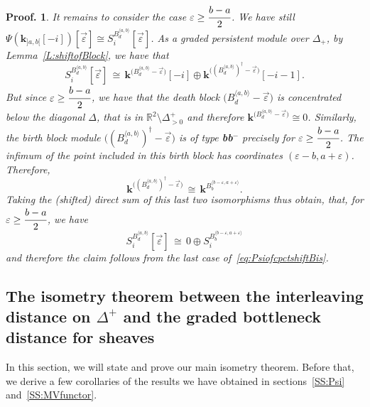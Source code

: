\documentclass[a4paper, english, 11pt]{article}
\newcommand{\kk}[0]{\textbf{k}}
\newcommand{\0}{\vec{0}}
\newtheorem*{pf}{Proof.} }
\begin{document}
\begin{pf}
\smallskip

It remains to consider the case  $\varepsilon \geq \cfrac{b-a}{2}$. We have still $\Psi(\kk_{]a,b[}[-i]) [\vec{\varepsilon}] \cong S_i^{B_{d}^{\langle a, b \rangle}} [\vec{\varepsilon}]$. As a graded persistent module over $\Delta_+$, by Lemma~\ref{L:shiftofBlock}, we have  
 that
$$S_i^{B_{d}^{\langle a, b \rangle}} [\vec{\varepsilon}] \,\cong\, \kk^{\big(B_{d}^{\langle a, b \rangle} -\vec{\varepsilon}\big)} [-i] \oplus \kk^{\big((B_{d}^{\langle a, b\rangle})^\dagger -\vec{\varepsilon}\big)} [-i-1].$$ 
But since  $\varepsilon \geq \cfrac{b-a}{2}$, we have that the death block  $\big(B_{d}^{\langle a, b \rangle} -\vec{\varepsilon}\big)$ is concentrated below the diagonal $\Delta$, that is in $\mathbb{R}^2\setminus \Delta^+_{>0}$ and therefore $ \kk^{\big(B_{d}^{\langle a, b \rangle} -\vec{\varepsilon}\big)}\cong 0$.  Similarly, the birth block module  
$\big((B_{d}^{\langle a, b\rangle})^\dagger -\vec{\varepsilon}\big)$ is of type \textbf{bb}$^{-}$ precisely for $\varepsilon \geq \cfrac{b-a}{2}$. The infimum of the point included in this birth block has coordinates $(\varepsilon -b, a+\varepsilon)$. Therefore, 
$$\kk^{\big((B_{d}^{\langle a, b\rangle})^\dagger -\vec{\varepsilon}\big)} \, \cong \, \kk^{B_{b}^{\langle b-\varepsilon, a+\varepsilon \rangle}}.$$
Taking the (shifted) direct sum of this last two isomorphisms thus obtain, that, for $\varepsilon \geq \cfrac{b-a}{2}$, we have  
$$ S_i^{B_{d}^{\langle a, b \rangle}} [\vec{\varepsilon}] \,\cong\, 0 \oplus S_i^{B_{b}^{\langle b-\varepsilon, a+\varepsilon \rangle}}$$
and therefore the claim follows from the last case of~\eqref{eq:PsiofcpctshiftBis}.
\end{pf}

\subsection{The isometry theorem between the interleaving distance on $\Delta^+$ and the graded bottleneck distance for sheaves} 
In this section, we will state and prove our main isometry theorem. 
Before that, we derive a few corollaries of the results we have obtained in sections~\ref{SS:Psi} and~\ref{SS:MVfunctor}.

\smallskip
\end{document}
